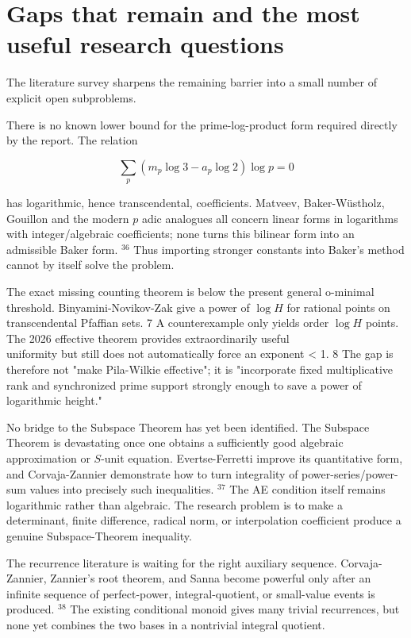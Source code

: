 \documentclass[10pt]{article}
\begin{document}
\section*{Gaps that remain and the most useful research questions}
The literature survey sharpens the remaining barrier into a small number of explicit open subproblems.

There is no known lower bound for the prime-log-product form required directly by the report. The relation

$$
\sum_{p}\left(m_{p} \log 3-a_{p} \log 2\right) \log p=0
$$

has logarithmic, hence transcendental, coefficients. Matveev, Baker-Wüstholz, Gouillon and the modern $p$ adic analogues all concern linear forms in logarithms with integer/algebraic coefficients; none turns this bilinear form into an admissible Baker form. ${ }^{36}$ Thus importing stronger constants into Baker's method cannot by itself solve the problem.

The exact missing counting theorem is below the present general o-minimal threshold. Binyamini-Novikov-Zak give a power of $\log H$ for rational points on transcendental Pfaffian sets. 7 A counterexample only yields order $\log H$ points. The 2026 effective theorem provides extraordinarily useful\\
uniformity but still does not automatically force an exponent < 1. 8 The gap is therefore not "make Pila-Wilkie effective"; it is "incorporate fixed multiplicative rank and synchronized prime support strongly enough to save a power of logarithmic height."

No bridge to the Subspace Theorem has yet been identified. The Subspace Theorem is devastating once one obtains a sufficiently good algebraic approximation or $S$-unit equation. Evertse-Ferretti improve its quantitative form, and Corvaja-Zannier demonstrate how to turn integrality of power-series/power-sum values into precisely such inequalities. ${ }^{37}$ The AE condition itself remains logarithmic rather than algebraic. The research problem is to make a determinant, finite difference, radical norm, or interpolation coefficient produce a genuine Subspace-Theorem inequality.

The recurrence literature is waiting for the right auxiliary sequence. Corvaja-Zannier, Zannier's root theorem, and Sanna become powerful only after an infinite sequence of perfect-power, integral-quotient, or small-value events is produced. ${ }^{38}$ The existing conditional monoid gives many trivial recurrences, but none yet combines the two bases in a nontrivial integral quotient.
\end{document}
